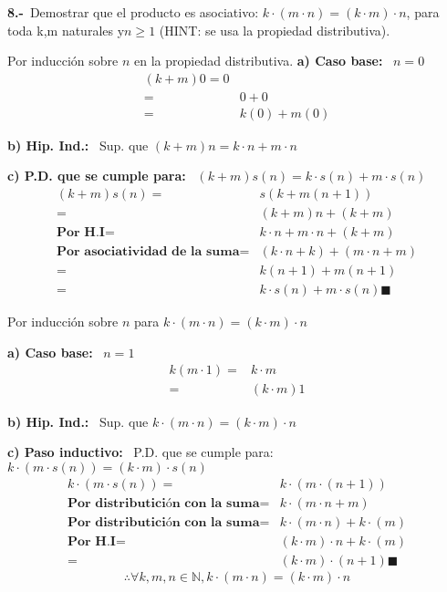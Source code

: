 \textbf{8.-}\ Demostrar que el producto es asociativo: $k\cdot(m\cdot n) = (k\cdot m)\cdot n$, para toda k,m
naturales y$n \geq 1$ (HINT: se usa la propiedad distributiva).

Por inducción sobre $n$ en la propiedad distributiva.
\textbf{a) Caso base: }\ $n=0$
\begin{align*}
    (k+m)0=0\\
          =&0+0\\
          =&k(0)+m(0)
\end{align*}

\textbf{b) Hip. Ind.: }\ Sup. que $(k+m)n=k\cdot n+m\cdot n$

\textbf{c) P.D. que se cumple para: }\ $(k+m)s(n) = k\cdot s(n) + m\cdot s(n)$
\begin{align*}
    (k+m)s(n)=&s(k+m(n+1))\\
            =&(k+m)n+(k+m)\\
    \textbf{Por H.I}=&k\cdot n + m\cdot n + (k+m)\\
     \textbf{Por asociatividad de la suma}=&(k\cdot n + k)+(m\cdot n+m)\\
      =& k(n+1)+m(n+1)\\
      =&k\cdot s(n)+m\cdot s(n)\blacksquare
\end{align*}

Por inducción sobre $n$ para $k\cdot(m\cdot n)=(k\cdot m)\cdot n$

\textbf{a) Caso base: }\ $n=1$
\begin{align*}
    k(m\cdot 1)=&k\cdot m\\
          =&(k\cdot m)1
\end{align*}

\textbf{b) Hip. Ind.: }\ Sup. que $k\cdot(m\cdot n)=(k\cdot m)\cdot n$

\textbf{c) Paso inductivo: }\ P.D. que se cumple para: $k\cdot(m\cdot s(n))=(k\cdot m)\cdot s(n)$
\begin{align*}
    k\cdot(m\cdot s(n))=& k\cdot(m\cdot (n+1))\\
   \textbf{Por distributición con la suma} =&k\cdot(m\cdot n + m )\\
   \textbf{Por distributición con la suma} =&k\cdot(m\cdot n) + k\cdot(m)\\
   \textbf{Por H.I} =&(k\cdot m)\cdot n + k\cdot(m)\\
                =&(k\cdot m)\cdot (n + 1) \blacksquare
\end{align*}
$$\therefore \forall k,m,n\in \mathbb{N}, k\cdot(m\cdot n)=(k\cdot m)\cdot n$$

